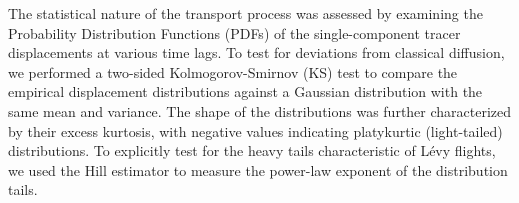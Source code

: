 \documentclass[]{article}
\begin{document}
The statistical nature of the transport process was assessed by examining the Probability Distribution Functions (PDFs) of the single-component tracer displacements at various time lags. To test for deviations from classical diffusion, we performed a two-sided Kolmogorov-Smirnov (KS) test to compare the empirical displacement distributions against a Gaussian distribution with the same mean and variance. The shape of the distributions was further characterized by their excess kurtosis, with negative values indicating platykurtic (light-tailed) distributions. To explicitly test for the heavy tails characteristic of Lévy flights, we used the Hill estimator to measure the power-law exponent of the distribution tails.
\end{document}
